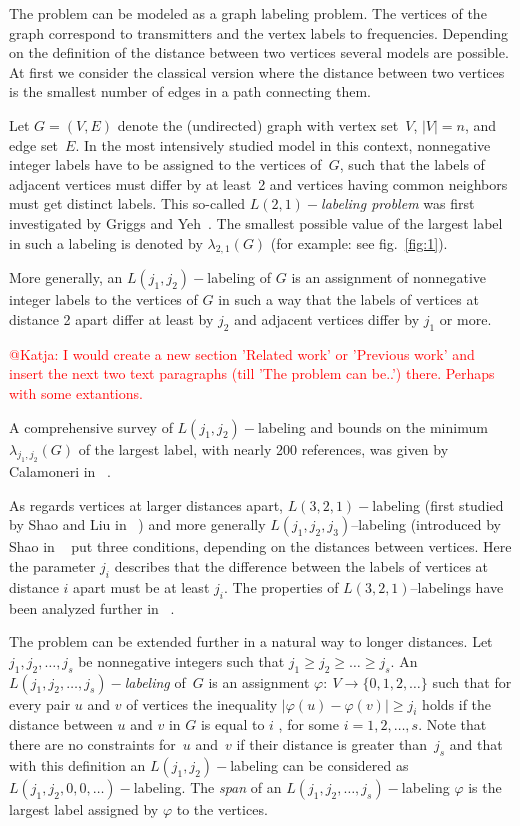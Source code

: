 \documentclass[smallextended]{svjour3}
\newcommand\ToDo[1]{\textcolor{red}{#1}}
\begin{document}
The problem can be modeled as a graph labeling problem. The vertices of
the graph correspond to transmitters and the vertex labels to frequencies.
Depending on the definition of the distance between two vertices several
models are possible. At first we consider the classical version where
the distance between two vertices is the smallest number of edges in a path connecting them.

Let $G=(V,E)$ denote the (undirected) graph with vertex set~$V$, $|V|=n$, and edge set~$E$.
In the most intensively studied model in this context, nonnegative
integer labels have to be assigned to the vertices of~$G$,
such that the labels of adjacent vertices must differ by at least~2 and
vertices having common neighbors must get distinct labels.
This so-called \emph{$L(2,1)-$labeling problem}
was first investigated by Griggs and Yeh~\cite{GY92}. The smallest
possible value of the largest label in such a labeling
is denoted by $\lambda_{2,1}(G)$ (for example: see fig.~\ref{fig:1}).



More generally, an $L(j_1,j_2)-$labeling of $G$ is an assignment of nonnegative
integer labels to the vertices of $G$ in such a way that the labels
of vertices at distance 2 apart differ at least by $j_2$ and adjacent
vertices differ by $j_1$ or more. 

\ToDo{ @Katja: I would create a new section 'Related work' or 'Previous work' and insert the next two text paragraphs (till 'The problem can be..') there. Perhaps with some extantions.}

A comprehensive survey of $L(j_{1},j_{2})-$labeling and bounds on
the minimum $\lambda_{j_{1},j_{2}}(G)$ of the largest label, with
nearly 200 references, was given by Calamoneri in ~\cite{3}.

As regards vertices at larger distances apart, $L(3,2,1)-$labeling
(first studied by Shao and Liu in ~\cite{4}) and more generally $L(j_{1},j_{2},j_{3})$--labeling (introduced by Shao in ~\cite{5} put three conditions, depending on the distances between vertices. Here the parameter $j_{i}$ describes that the difference between the labels of vertices at distance $i$ apart must be at least $j_{i}$. The properties of $L(3,2,1)$--labelings
have been analyzed further in ~\cite{6}. 
%

The problem can be extended further in a natural way to longer distances.
Let $j_1,j_2,\ldots,j_{s}$ be nonnegative integers such that $j_1\geq j_2\geq\ldots\geq j_{s}$. An \emph{$L(j_1,j_2,\ldots,j_{s})-$labeling} of~$G$ is an assignment $\varphi:\: V\rightarrow\{0,1,2,\ldots\}$ such that for every pair $u$ and $v$ of vertices the inequality $|\varphi(u)-\varphi(v)|\geq j_{i}$ holds if the distance between $u$ and $v$ in $G$ is equal to $i$ , for some $i=1,2,\ldots,s$. Note that there are no constraints for~$u$ and~$v$ if their
distance is greater than~$j_s$ and that with this definition an $L(j_1,j_2)-$labeling can be considered as $L(j_1,j_2,0,0,\ldots)-$labeling.
The \emph{span} of an $L(j_1,j_2,\ldots ,j_{s})-$labeling
$\varphi$ is the largest label assigned by $\varphi$ to the vertices.
\end{document}
